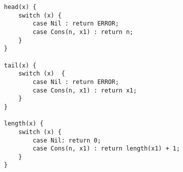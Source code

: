 \begin{lstlisting}
head(x) {
    switch (x) {
        case Nil : return ERROR;
        case Cons(n, x1) : return n;
    }
}

tail(x) {
    switch (x)  {
        case Nil : return ERROR;
        case Cons(n, x1) : return x1;
    }
}

length(x) {
    switch (x) {
        case Nil: return 0;
        case Cons(n, x1) : return length(x1) + 1;
    }
}
\end{lstlisting}
